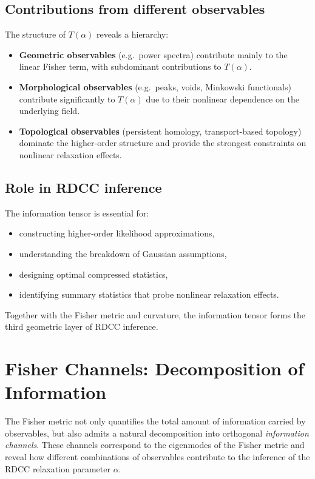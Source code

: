 \documentclass[11pt,a4paper]{article}
\begin{document}
\subsection{Contributions from different observables}

The structure of $T(\alpha)$ reveals a hierarchy:
\begin{itemize}
    \item \textbf{Geometric observables} (e.g.\ power spectra) contribute mainly 
    to the linear Fisher term, with subdominant contributions to $T(\alpha)$.

    \item \textbf{Morphological observables} (e.g.\ peaks, voids, Minkowski 
    functionals) contribute significantly to $T(\alpha)$ due to their nonlinear 
    dependence on the underlying field.

    \item \textbf{Topological observables} (persistent homology, transport-based 
    topology) dominate the higher-order structure and provide the strongest 
    constraints on nonlinear relaxation effects.
\end{itemize}

\subsection{Role in RDCC inference}

The information tensor is essential for:
\begin{itemize}
    \item constructing higher-order likelihood approximations,
    \item understanding the breakdown of Gaussian assumptions,
    \item designing optimal compressed statistics,
    \item identifying summary statistics that probe nonlinear relaxation effects.
\end{itemize}

Together with the Fisher metric and curvature, the information tensor forms the 
third geometric layer of RDCC inference.
\section{Fisher Channels: Decomposition of Information}

The Fisher metric not only quantifies the total amount of information carried by 
observables, but also admits a natural decomposition into orthogonal 
\emph{information channels}. These channels correspond to the eigenmodes of the 
Fisher metric and reveal how different combinations of observables contribute to 
the inference of the RDCC relaxation parameter $\alpha$.
\end{document}
